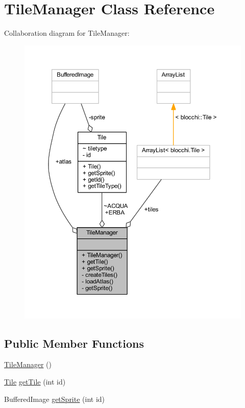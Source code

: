 \hypertarget{classblocchi_1_1_tile_manager}{}\section{Tile\+Manager Class Reference}
\label{classblocchi_1_1_tile_manager}


Collaboration diagram for Tile\+Manager\+:
\nopagebreak
\begin{figure}[H]
\begin{center}
\leavevmode
\includegraphics[width=350pt]{classblocchi_1_1_tile_manager__coll__graph}
\end{center}
\end{figure}
\subsection*{Public Member Functions}
\begin{DoxyCompactItemize}
\item 
\hyperlink{classblocchi_1_1_tile_manager_a041c1b12a4eb5574dfedf0af6393c014}{Tile\+Manager} ()
\item 
\hyperlink{classblocchi_1_1_tile}{Tile} \hyperlink{classblocchi_1_1_tile_manager_a1855b58fdbe502789d9c14ee0deffb9e}{get\+Tile} (int id)
\item 
Buffered\+Image \hyperlink{classblocchi_1_1_tile_manager_a46ebd32c7ec4ac506010fe465687bdd7}{get\+Sprite} (int id)
\end{DoxyCompactItemize}
